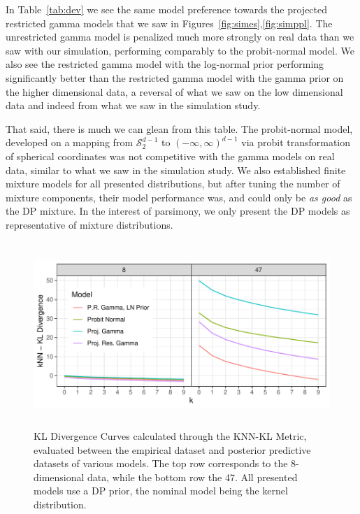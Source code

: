 In Table~\ref{tab:dev} we see the same model preference towards the projected restricted gamma models
  that we saw in Figures~\ref{fig:simes},\ref{fig:simppl}.  The unrestricted gamma model is penalized much
  more strongly on real data than we saw with our simulation, performing comparably to the probit-normal
  model.  We also see the restricted gamma model with the log-normal prior performing significantly
  better than the restricted gamma model with the gamma prior on the higher dimensional data, a reversal
  of what we saw on the low dimensional data and indeed from what we saw in the simulation study.

That said, there is much we can glean from this table.  The probit-normal model, developed on a mapping
  from $\mathcal{S}_{2}^{d-1}$ to $(-\infty,\infty)^{d-1}$ via probit transformation of spherical coordinates
  was not competitive with the gamma models on real data, similar to what we saw in the simulation study. We also established finite mixture
  models for all presented distributions, but after tuning the number of mixture components, their
  model performance was, and could only be \emph{as good} as the DP mixture.  In the interest of parsimony, we only present the DP models as representative of mixture distributions.

\begin{figure}[ht]
  \centering
  \caption{KL Divergence Curves calculated through the KNN-KL Metric, evaluated between the
  empirical dataset and posterior predictive datasets of various models.  The top row corresponds
  to the 8-dimensional data, while the bottom row the 47.  All presented models use a DP prior, 
  the nominal model being the kernel distribution.\label{fig:knnkl}}
  \includegraphics[width = 5.5in, height = 2.75in]{./images/knn_kld}
\end{figure}

